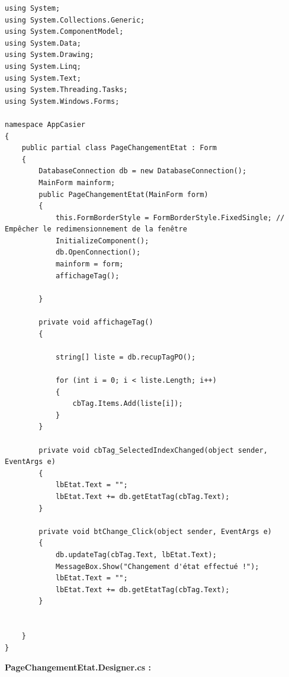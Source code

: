 \documentclass[main.tex]{subfiles}
\begin{document}
\begin{lstlisting}
using System;
using System.Collections.Generic;
using System.ComponentModel;
using System.Data;
using System.Drawing;
using System.Linq;
using System.Text;
using System.Threading.Tasks;
using System.Windows.Forms;

namespace AppCasier
{
    public partial class PageChangementEtat : Form
    {
        DatabaseConnection db = new DatabaseConnection();
        MainForm mainform;
        public PageChangementEtat(MainForm form)
        {
            this.FormBorderStyle = FormBorderStyle.FixedSingle; // Empêcher le redimensionnement de la fenêtre
            InitializeComponent();
            db.OpenConnection();
            mainform = form;
            affichageTag();

        }

        private void affichageTag()
        {

            string[] liste = db.recupTagPO();

            for (int i = 0; i < liste.Length; i++)
            {
                cbTag.Items.Add(liste[i]);
            }
        }

        private void cbTag_SelectedIndexChanged(object sender, EventArgs e)
        {
            lbEtat.Text = "";
            lbEtat.Text += db.getEtatTag(cbTag.Text);
        }

        private void btChange_Click(object sender, EventArgs e)
        {
            db.updateTag(cbTag.Text, lbEtat.Text);
            MessageBox.Show("Changement d'état effectué !");
            lbEtat.Text = "";
            lbEtat.Text += db.getEtatTag(cbTag.Text);
        }


    }
}
\end{lstlisting}

\textbf{PageChangementEtat.Designer.cs :}
\end{document}
